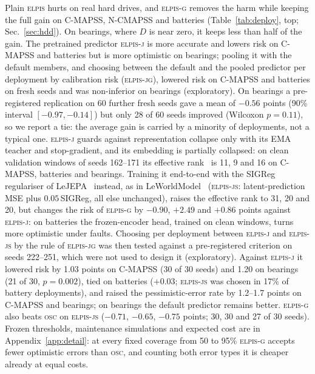 \documentclass{esannV2}
\newcommand{\OSC}{\textsc{osc}}
\newcommand{\RPT}{\textsc{elpis}}
\newcommand{\AUTOD}{\textsc{elpis-g}}
\newcommand{\EJ}{\textsc{elpis-j}}
\newcommand{\EJG}{\textsc{elpis-jg}}
\newcommand{\EJS}{\textsc{elpis-js}}
\begin{document}
Plain \RPT{} hurts on real hard drives, and \AUTOD{} removes the harm while keeping the full gain on C-MAPSS, N-CMAPSS and batteries (Table~\ref{tab:deploy}, top; Sec.~\ref{sec:hdd}). On bearings, where $D$ is near zero, it keeps less than half of the gain. The pretrained predictor \EJ{} is more accurate and lowers risk on C-MAPSS and batteries but is more optimistic on bearings; pooling it with the default members, and choosing between the default and the pooled predictor per deployment by calibration risk (\EJG), lowered risk on C-MAPSS and batteries on fresh seeds and was non-inferior on bearings (exploratory). On bearings a pre-registered replication on 60 further fresh seeds gave a mean of $-0.56$ points (90\% interval $[-0.97,-0.14]$) but only 28 of 60 seeds improved (Wilcoxon $p=0.11$), so we report a tie: the average gain is carried by a minority of deployments, not a typical one. \EJ{} guards against representation collapse only with its EMA teacher and stop-gradient, and its embedding is partially collapsed: on clean validation windows of seeds 162--171 its effective rank~\cite{roy2007effective} is 11, 9 and 16 on C-MAPSS, batteries and bearings. Training it end-to-end with the SIGReg regulariser of LeJEPA~\cite{balestriero2025lejepa} instead, as in LeWorldModel~\cite{maes2026leworldmodel} (\EJS: latent-prediction MSE plus $0.05\,$SIGReg, all else unchanged), raises the effective rank to 31, 20 and 20, but changes the risk of \AUTOD{} by $-0.90$, $+2.49$ and $+0.86$ points against \EJ: on batteries the frozen-encoder head, trained on clean windows, turns more optimistic under faults. Choosing per deployment between \EJ{} and \EJS{} by the rule of \EJG{} was then tested against a pre-registered criterion on seeds 222--251, which were not used to design it (exploratory). Against \EJ{} it lowered risk by 1.03 points on C-MAPSS (30 of 30 seeds) and 1.20 on bearings (21 of 30, $p=0.002$), tied on batteries ($+0.03$; \EJS{} was chosen in 17\% of battery deployments), and raised the pessimistic-error rate by 1.2--1.7 points on C-MAPSS and bearings; on bearings the default predictor remains better. \AUTOD{} also beats \OSC{} on \EJS{} ($-0.71$, $-0.65$, $-0.75$ points; 30, 30 and 27 of 30 seeds). Frozen thresholds, maintenance simulations and expected cost are in Appendix~\ref{app:detail}: at every fixed coverage from 50 to 95\% \AUTOD{} accepts fewer optimistic errors than \OSC, and counting both error types it is cheaper already at equal costs.

\FloatBarrier
\end{document}

